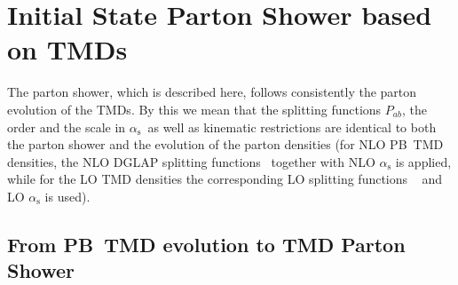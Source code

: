 \documentclass[11pt]{article} \usepackage{mystyle-new}
\newcommand{\as}{\ensuremath{\alpha_\mathrm{s}}}
\def\PB{{PB}}
\begin{document}
\section{Initial State Parton Shower based on TMDs}

The parton shower, which is described here, follows consistently the parton evolution of the TMDs. 
By this we mean that the splitting functions $P_{ab}$, the order and  the scale in \as\, as well as  kinematic restrictions are identical to both the parton shower and the evolution of the parton densities (for NLO \PB\ TMD densities, the NLO DGLAP splitting functions~\cite{Furmanski:1981cw,Curci:1980uw} together with NLO $\as$ is applied, while for the LO TMD densities the corresponding LO splitting functions ~\cite{Dokshitzer:1977sg,Altarelli:1977zs,Gribov:1972ri} and LO $\as$ is used).

\subsection{From \PB\ TMD evolution to TMD Parton Shower}
\end{document}
